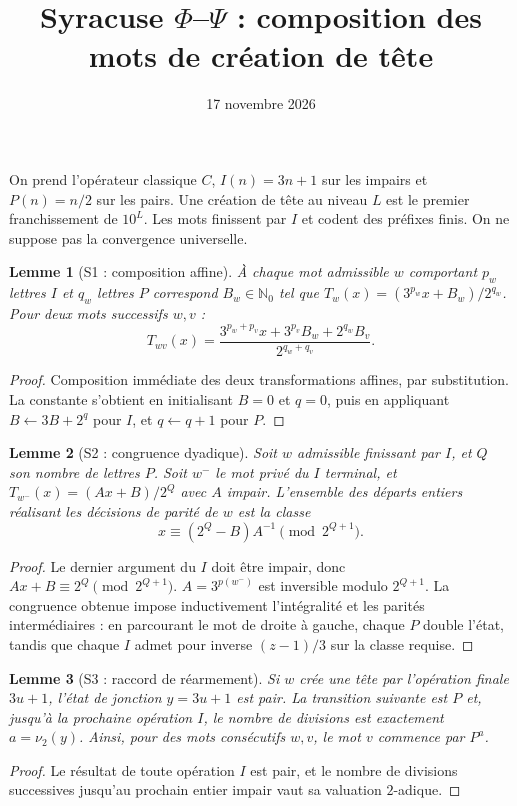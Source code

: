 \documentclass[11pt,a4paper]{article}
\title{Syracuse $\Phi$--$\Psi$ : composition des mots de création de tête}
\date{17 novembre 2026}
\newtheorem{lemma}{Lemme}
\begin{document}
\maketitle
On prend l'opérateur classique $C$, $I(n)=3n+1$ sur les impairs et $P(n)=n/2$ sur les pairs. Une création de tête au niveau $L$ est le premier franchissement de $10^L$. Les mots finissent par $I$ et codent des préfixes finis. On ne suppose pas la convergence universelle.
\begin{lemma}[S1 : composition affine]
À chaque mot admissible $w$ comportant $p_w$ lettres $I$ et $q_w$ lettres $P$ correspond $B_w\in\mathbb N_0$ tel que $T_w(x)=(3^{p_w}x+B_w)/2^{q_w}$. Pour deux mots successifs $w,v$ :
\[
T_{wv}(x)=\frac{3^{p_w+p_v}x+3^{p_v}B_w+2^{q_w}B_v}{2^{q_w+q_v}}.
\]
\end{lemma}
\begin{proof}Composition immédiate des deux transformations affines, par substitution. La constante s'obtient en initialisant $B=0$ et $q=0$, puis en appliquant $B\leftarrow3B+2^q$ pour $I$, et $q\leftarrow q+1$ pour $P$.\end{proof}
\begin{lemma}[S2 : congruence dyadique]
Soit $w$ admissible finissant par $I$, et $Q$ son nombre de lettres $P$. Soit $w^-$ le mot privé du $I$ terminal, et $T_{w^-}(x)=(Ax+B)/2^Q$ avec $A$ impair. L'ensemble des départs entiers réalisant les décisions de parité de $w$ est la classe
\[
x\equiv(2^Q-B)A^{-1}\pmod{2^{Q+1}}.
\]
\end{lemma}
\begin{proof}Le dernier argument du $I$ doit être impair, donc $Ax+B\equiv2^Q\pmod{2^{Q+1}}$. $A=3^{p(w^-)}$ est inversible modulo $2^{Q+1}$. La congruence obtenue impose inductivement l'intégralité et les parités intermédiaires : en parcourant le mot de droite à gauche, chaque $P$ double l'état, tandis que chaque $I$ admet pour inverse $(z-1)/3$ sur la classe requise.\end{proof}
\begin{lemma}[S3 : raccord de réarmement]
Si $w$ crée une tête par l'opération finale $3u+1$, l'état de jonction $y=3u+1$ est pair. La transition suivante est $P$ et, jusqu'à la prochaine opération $I$, le nombre de divisions est exactement $a=\nu_2(y)$. Ainsi, pour des mots consécutifs $w,v$, le mot $v$ commence par $P^a$.
\end{lemma}
\begin{proof}Le résultat de toute opération $I$ est pair, et le nombre de divisions successives jusqu'au prochain entier impair vaut sa valuation $2$-adique.\end{proof}
\end{document}
